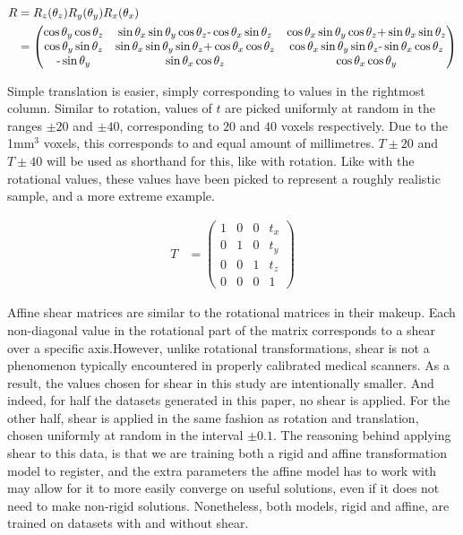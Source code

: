 \begin{align}
  R &= R_z(\theta_z) R_y(\theta_y) R_x(\theta_x)\notag\\
  &=
  \begin{pmatrix}
    \cos\theta_y\cos\theta_z & \sin\theta_x\sin\theta_y\cos\theta_z \text{-} \cos\theta_x\sin\theta_z& \cos\theta_x\sin\theta_y\cos\theta_z \text{+} \sin\theta_x\sin\theta_z\\
    \cos\theta_y\sin\theta_z & \sin\theta_x\sin\theta_y\sin\theta_z \text{+} \cos\theta_x\cos\theta_z& \cos\theta_x\sin\theta_y\sin\theta_z \text{-} \sin\theta_x\cos\theta_z\\
    \text{-}\sin\theta_y & \sin\theta_x\cos\theta_z & \cos\theta_x\cos\theta_y
  \end{pmatrix}\label{eq:rot_matrix}
\end{align}

Simple translation is easier, simply corresponding to values in the rightmost column. Similar to rotation, values of $t$ are picked uniformly at random in the ranges $\pm20$ and $\pm40$, corresponding to $20$ and $40$ voxels respectively. Due to the 1mm$^3$ voxels, this corresponds to and equal amount of millimetres. $T\pm20$ and $T\pm40$ will be used as shorthand for this, like with rotation. Like with the rotational values, these values have been picked to represent a roughly realistic sample, and a more extreme example.

\begin{align*}
  T &=
  \begin{pmatrix}
    1 & 0 & 0 & t_x \\
    0 & 1 & 0 & t_y \\
    0 & 0 & 1 & t_z \\
    0 & 0 & 0 & 1
  \end{pmatrix}
\end{align*}

Affine shear matrices are similar to the rotational matrices in their makeup. Each non-diagonal value in the rotational part of the matrix corresponds to a shear over a specific axis.However, unlike rotational transformations, shear is not a phenomenon typically encountered in properly calibrated medical scanners. As a result, the values chosen for shear in this study are intentionally smaller. And indeed, for half the datasets generated in this paper, no shear is applied. For the other half, shear is applied in the same fashion as rotation and translation, chosen uniformly at random in the interval $\pm0.1$. The reasoning behind applying shear to this data, is that we are training both a rigid and affine transformation model to register, and the extra parameters the affine model has to work with may allow for it to more easily converge on useful solutions, even if it does not need to make non-rigid solutions. Nonetheless, both models, rigid and affine, are trained on datasets with and without shear.

